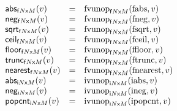 $$
\begin{array}[t]{@{}lcl@{}l@{}}
{\mathsf{abs}}{{}_{{{\mathsf{f}}{N}}{\mathsf{x}}{M}}(v)} & = & {{\mathrm{fvunop}}}_{{{\mathsf{f}}{N}}{\mathsf{x}}{M}}({\mathrm{fabs}}, v) \\
{\mathsf{neg}}{{}_{{{\mathsf{f}}{N}}{\mathsf{x}}{M}}(v)} & = & {{\mathrm{fvunop}}}_{{{\mathsf{f}}{N}}{\mathsf{x}}{M}}({\mathrm{fneg}}, v) \\
{\mathsf{sqrt}}{{}_{{{\mathsf{f}}{N}}{\mathsf{x}}{M}}(v)} & = & {{\mathrm{fvunop}}}_{{{\mathsf{f}}{N}}{\mathsf{x}}{M}}({\mathrm{fsqrt}}, v) \\
{\mathsf{ceil}}{{}_{{{\mathsf{f}}{N}}{\mathsf{x}}{M}}(v)} & = & {{\mathrm{fvunop}}}_{{{\mathsf{f}}{N}}{\mathsf{x}}{M}}({\mathrm{fceil}}, v) \\
{\mathsf{floor}}{{}_{{{\mathsf{f}}{N}}{\mathsf{x}}{M}}(v)} & = & {{\mathrm{fvunop}}}_{{{\mathsf{f}}{N}}{\mathsf{x}}{M}}({\mathrm{ffloor}}, v) \\
{\mathsf{trunc}}{{}_{{{\mathsf{f}}{N}}{\mathsf{x}}{M}}(v)} & = & {{\mathrm{fvunop}}}_{{{\mathsf{f}}{N}}{\mathsf{x}}{M}}({\mathrm{ftrunc}}, v) \\
{\mathsf{nearest}}{{}_{{{\mathsf{f}}{N}}{\mathsf{x}}{M}}(v)} & = & {{\mathrm{fvunop}}}_{{{\mathsf{f}}{N}}{\mathsf{x}}{M}}({\mathrm{fnearest}}, v) \\
{\mathsf{abs}}{{}_{{{\mathsf{i}}{N}}{\mathsf{x}}{M}}(v)} & = & {{\mathrm{ivunop}}}_{{{\mathsf{i}}{N}}{\mathsf{x}}{M}}({\mathrm{iabs}}, v) \\
{\mathsf{neg}}{{}_{{{\mathsf{i}}{N}}{\mathsf{x}}{M}}(v)} & = & {{\mathrm{ivunop}}}_{{{\mathsf{i}}{N}}{\mathsf{x}}{M}}({\mathrm{ineg}}, v) \\
{\mathsf{popcnt}}{{}_{{{\mathsf{i}}{N}}{\mathsf{x}}{M}}(v)} & = & {{\mathrm{ivunop}}}_{{{\mathsf{i}}{N}}{\mathsf{x}}{M}}({\mathrm{ipopcnt}}, v) \\
\end{array}
$$

